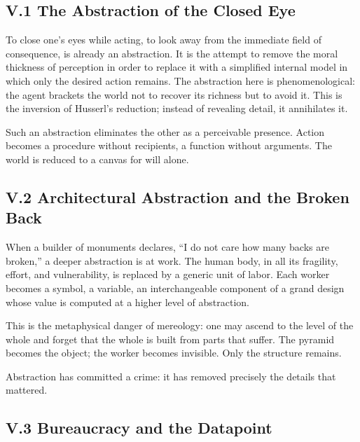 \documentclass[12pt,letterpaper]{article}
\begin{document}
\subsection{V.1 The Abstraction of the Closed Eye}

To close one’s eyes while acting, to look away from the immediate field of consequence, is already an abstraction. It is the attempt to remove the moral thickness of perception in order to replace it with a simplified internal model in which only the desired action remains. The abstraction here is phenomenological: the agent brackets the world not to recover its richness but to avoid it. This is the inversion of Husserl’s reduction; instead of revealing detail, it annihilates it.

Such an abstraction eliminates the other as a perceivable presence. Action becomes a procedure without recipients, a function without arguments. The world is reduced to a canvas for will alone.

\subsection{V.2 Architectural Abstraction and the Broken Back}

When a builder of monuments declares, ``I do not care how many backs are broken,'' a deeper abstraction is at work. The human body, in all its fragility, effort, and vulnerability, is replaced by a generic unit of labor. Each worker becomes a symbol, a variable, an interchangeable component of a grand design whose value is computed at a higher level of abstraction.

This is the metaphysical danger of mereology: one may ascend to the level of the whole and forget that the whole is built from parts that suffer. The pyramid becomes the object; the worker becomes invisible. Only the structure remains.

Abstraction has committed a crime: it has removed precisely the details that mattered.

\subsection{V.3 Bureaucracy and the Datapoint}
\end{document}
